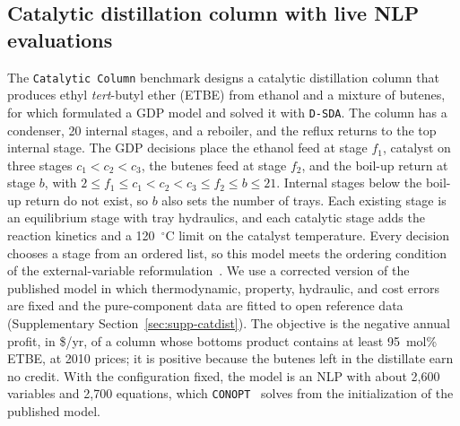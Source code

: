 \documentclass{article}
\begin{document}
\subsection{Catalytic distillation column with live NLP evaluations}
\label{sec:catdist-case}
The \texttt{Catalytic Column} benchmark designs a catalytic distillation column that produces ethyl \textit{tert}-butyl ether (ETBE) from ethanol and a mixture of butenes, for which \citet{linan2020optimalII} formulated a GDP model and solved it with \texttt{D-SDA}.
The column has a condenser, 20 internal stages, and a reboiler, and the reflux returns to the top internal stage.
The GDP decisions place the ethanol feed at stage \(f_1\), catalyst on three stages \(c_1<c_2<c_3\), the butenes feed at stage \(f_2\), and the boil-up return at stage \(b\), with \(2\le f_1\le c_1<c_2<c_3\le f_2\le b\le 21\).
Internal stages below the boil-up return do not exist, so \(b\) also sets the number of trays.
Each existing stage is an equilibrium stage with tray hydraulics, and each catalytic stage adds the reaction kinetics and a 120~\(^\circ\)C limit on the catalyst temperature.
Every decision chooses a stage from an ordered list, so this model meets the ordering condition of the external-variable reformulation~\citep{ovalle2025logic}.
We use a corrected version of the published model in which thermodynamic, property, hydraulic, and cost errors are fixed and the pure-component data are fitted to open reference data (Supplementary Section~\ref{sec:supp-catdist}).
The objective is the negative annual profit, in \$/yr, of a column whose bottoms product contains at least 95~mol\% ETBE, at 2010 prices; it is positive because the butenes left in the distillate earn no credit.
With the configuration fixed, the model is an NLP with about 2,600 variables and 2,700 equations, which \texttt{CONOPT}~\citep{drud1994conopt} solves from the initialization of the published model.
\end{document}
